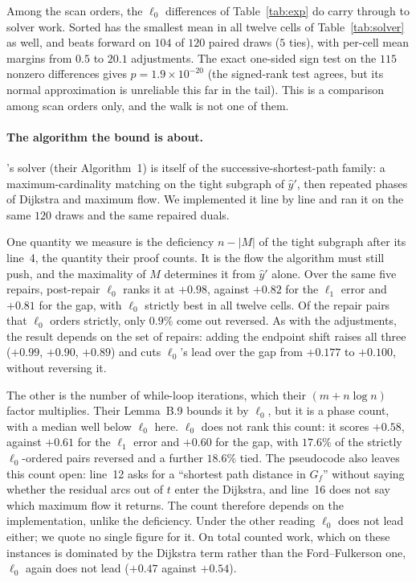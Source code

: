 Among the scan orders, the $\ell_0$ differences of Table~\ref{tab:exp} do carry through to solver
work. Sorted has the smallest mean in all twelve cells of Table~\ref{tab:solver} as well, and beats
forward on $104$ of $120$ paired draws ($5$ ties), with per-cell mean margins from $0.5$ to $20.1$
adjustments. The exact one-sided sign test on the $115$ nonzero differences gives
$p = 1.9\times10^{-20}$ (the signed-rank test agrees, but its normal approximation is unreliable
this far in the tail). This is a comparison among scan orders only, and the walk is not one of them.

\paragraph{The algorithm the bound is about.} \citeauthor{chen2022}'s solver (their Algorithm~1)
is itself of the successive-shortest-path family: a maximum-cardinality matching on the tight subgraph of $\hat y'$, then repeated
phases of Dijkstra and maximum flow. We implemented it line by line and ran it on the same $120$ draws and
the same repaired duals.

One quantity we measure is the deficiency $n - |M|$ of the tight subgraph after its line~4, the quantity their
proof counts. It is the flow the algorithm must still push, and the maximality of $M$ determines it
from $\hat y'$ alone. Over the same five repairs, post-repair $\ell_0$ ranks it at $+0.98$, against
$+0.82$ for the $\ell_1$ error and $+0.81$ for the gap, with $\ell_0$ strictly best in all twelve
cells. Of the repair pairs that $\ell_0$ orders strictly, only $0.9\%$ come out reversed. As with
the adjustments, the result depends on the set of repairs: adding the endpoint shift raises all three ($+0.99$, $+0.90$,
$+0.89$) and cuts $\ell_0$'s lead over the gap from $+0.177$ to $+0.100$, without reversing it.

The other is the number of while-loop iterations, which their $(m + n\log n)$ factor multiplies.
Their Lemma~B.9 bounds it by $\ell_0$, but it is a phase count, with a median well below $\ell_0$
here. $\ell_0$ does not rank this count: it scores $+0.58$, against $+0.61$ for the $\ell_1$ error
and $+0.60$ for the gap, with $17.6\%$ of the strictly $\ell_0$-ordered pairs reversed and a
further $18.6\%$ tied. The pseudocode also leaves this count open: line~12 asks for a ``shortest
path distance in $G_f$'' without saying whether the residual arcs out of $t$ enter the Dijkstra,
and line~16 does not say which maximum flow it returns. The count therefore depends on the
implementation, unlike the deficiency. Under the other reading $\ell_0$ does not lead either; we
quote no single figure for it. On total counted work, which on these instances is dominated by the
Dijkstra term rather than the Ford--Fulkerson one, $\ell_0$ again does not lead ($+0.47$ against
$+0.54$).

